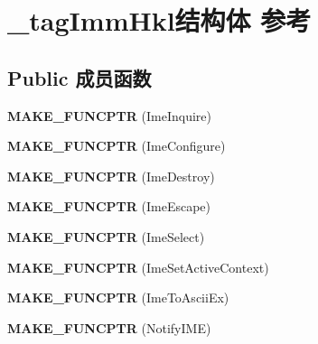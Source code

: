\hypertarget{struct__tag_imm_hkl}{}\section{\+\_\+tag\+Imm\+Hkl结构体 参考}
\label{struct__tag_imm_hkl}
\subsection*{Public 成员函数}
\begin{DoxyCompactItemize}
\item 
\mbox{\label{struct__tag_imm_hkl_ab1dbc354d519ea2dfbb8fafb4dc31852}} 
{\bfseries M\+A\+K\+E\+\_\+\+F\+U\+N\+C\+P\+TR} (Ime\+Inquire)
\item 
\mbox{\label{struct__tag_imm_hkl_a25522192f867bea87a15a9367d097b83}} 
{\bfseries M\+A\+K\+E\+\_\+\+F\+U\+N\+C\+P\+TR} (Ime\+Configure)
\item 
\mbox{\label{struct__tag_imm_hkl_ac2165940d5bcedb5ad5158a4aaad05df}} 
{\bfseries M\+A\+K\+E\+\_\+\+F\+U\+N\+C\+P\+TR} (Ime\+Destroy)
\item 
\mbox{\label{struct__tag_imm_hkl_ae9d183a395309f4e2405cd57612819ff}} 
{\bfseries M\+A\+K\+E\+\_\+\+F\+U\+N\+C\+P\+TR} (Ime\+Escape)
\item 
\mbox{\label{struct__tag_imm_hkl_a320257cd7d0ab060c8d584e64de9e6df}} 
{\bfseries M\+A\+K\+E\+\_\+\+F\+U\+N\+C\+P\+TR} (Ime\+Select)
\item 
\mbox{\label{struct__tag_imm_hkl_a576e5ccd5e644dda2a8e49e6065eea03}} 
{\bfseries M\+A\+K\+E\+\_\+\+F\+U\+N\+C\+P\+TR} (Ime\+Set\+Active\+Context)
\item 
\mbox{\label{struct__tag_imm_hkl_a22a789d6d1639d29199872a5ef6667fd}} 
{\bfseries M\+A\+K\+E\+\_\+\+F\+U\+N\+C\+P\+TR} (Ime\+To\+Ascii\+Ex)
\item 
\mbox{\label{struct__tag_imm_hkl_a66a2e61b928b9df97b92844d8d03248f}} 
{\bfseries M\+A\+K\+E\+\_\+\+F\+U\+N\+C\+P\+TR} (Notify\+I\+ME)
\item 

\end{DoxyCompactItemize}
